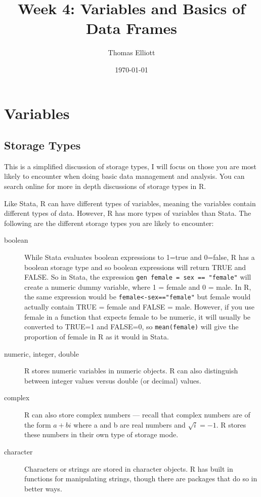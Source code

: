 \documentclass[12pt, oneside]{amsart}   	%
\title{Week 4: Variables and Basics of Data Frames}
\author{Thomas Elliott}
\date{\today}							%
\begin{document}
\maketitle
\lstset{language=R}

\section{Variables}

\subsection{Storage Types}

This is a simplified discussion of storage types, I will focus on those you are most likely to encounter when doing basic data management and analysis. You can search online for more in depth discussions of storage types in R.

Like Stata, R can have different types of variables, meaning the variables contain different types of data. However, R has more types of variables than Stata. The following are the different storage types you are likely to encounter:

\begin{description}
\item[boolean] While Stata evaluates boolean expressions to 1=true and 0=false, R has a boolean storage type and so boolean expressions will return TRUE and FALSE. So in Stata, the expression \texttt{gen female = sex == "female"} will create a numeric dummy variable, where 1 = female and 0 = male. In R, the same expression would be \texttt{female<-sex=="female"} but female would actually contain TRUE = female and FALSE = male. However, if you use female in a function that expects female to be numeric, it will usually be converted to TRUE=1 and FALSE=0, so \texttt{mean(female)} will give the proportion of female in R as it would in Stata.

\item[numeric, integer, double] R stores numeric variables in numeric objects. R can also distinguish between integer values versus double (or decimal) values. 

\item[complex] R can also store complex numbers --- recall that complex numbers are of the form $a + bi$ where a and b are real numbers and $\sqrt{i} = -1$. R stores these numbers in their own type of storage mode.

\item[character] Characters or strings are stored in character objects. R has built in functions for manipulating strings, though there are packages that do so in better ways.
\end{description}
\end{document}
